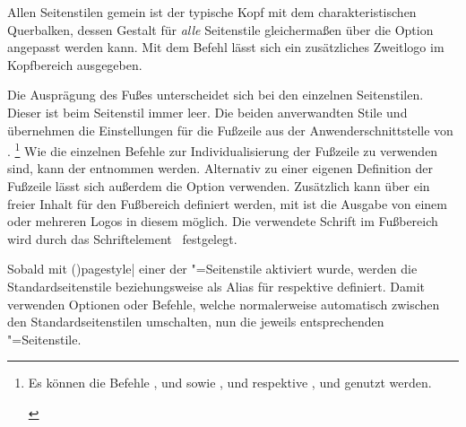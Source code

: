 \begin{DeclareEntity*}{}
\begin{DeclareEntity*}{}
\begin{DeclareEntity*}{}
\begin{Declaration}
\begin{Declaration}
\begin{Declaration}
%
Allen Seitenstilen gemein ist der typische Kopf mit dem charakteristischen 
Querbalken, dessen Gestalt für \emph{alle} Seitenstile gleichermaßen über die 
Option  angepasst werden kann. Mit dem Befehl  
lässt sich ein zusätzliches Zweitlogo im Kopfbereich ausgegeben.

Die Ausprägung des Fußes unterscheidet sich bei den einzelnen Seitenstilen. 
Dieser ist beim Seitenstil  immer leer. Die beiden 
anverwandten Stile  und  
übernehmen die Einstellungen für die Fußzeile aus der Anwenderschnittstelle 
von .%
\footnote{%
  \begin{Entity}{}%
  Es können die Befehle
  ,  und  sowie , 
   und  respektive ,  und 
   genutzt werden.%
  \end{Entity}%
}
Wie die einzelnen Befehle zur Individualisierung der Fußzeile zu verwenden 
sind, kann der  entnommen werden. Alternativ 
zu einer eigenen Definition der Fußzeile lässt sich außerdem die Option 
 verwenden. Zusätzlich kann über  ein freier 
Inhalt für den Fußbereich definiert werden, mit  ist die 
Ausgabe von einem oder mehreren Logos in diesem möglich. Die verwendete Schrift 
im Fußbereich wird durch das Schriftelement~ festgelegt.

Sobald mit \Macro(){pagestyle|} 
einer der "=Seitenstile aktiviert wurde, werden die 
Standardseitenstile  beziehungsweise  als 
Alias für  respektive  
definiert. Damit verwenden Optionen oder Befehle, welche normalerweise 
automatisch zwischen den Standardseitenstilen umschalten, nun die jeweils 
entsprechenden "=Seitenstile.


\end{Declaration}
\end{Declaration}
\end{Declaration}
\end{DeclareEntity*}
\end{DeclareEntity*}
\end{DeclareEntity*}
